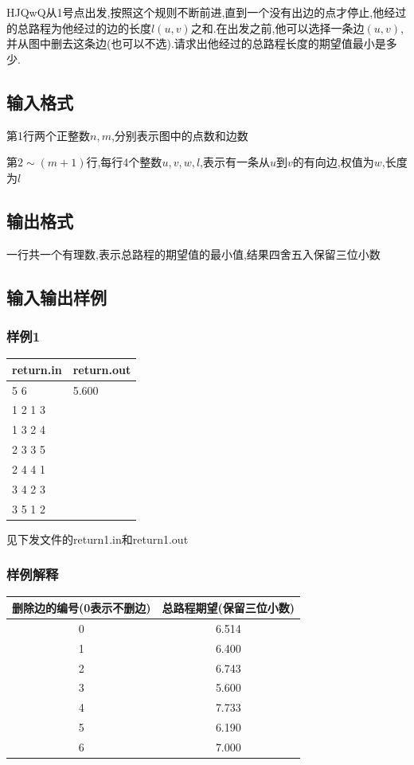 \documentclass[12pt]{ctexart}
\begin{document}
	HJQwQ从1号点出发,按照这个规则不断前进,直到一个没有出边的点才停止,他经过的总路程为他经过的边的长度$l(u,v)$之和.在出发之前,他可以选择一条边$(u,v)$,并从图中删去这条边(也可以不选).请求出他经过的总路程长度的期望值最小是多少.
	\subsection{输入格式}
	第1行两个正整数$n,m$,分别表示图中的点数和边数

	第$2\sim(m+1)$行,每行4个整数$u,v,w,l$,表示有一条从$u$到$v$的有向边,权值为$w$,长度为$l$
	\subsection{输出格式}
	一行共一个有理数,表示总路程的期望值的最小值,结果四舍五入保留三位小数
	\subsection{输入输出样例}
	\subsubsection{样例1}
	\begin{center}
		\begin{tabular}{|p{6cm}|p{6cm}|}
			\hline return.in&return.out\\
			\hline	5 6&5.600\\
					1 2 1 3&\\
					1 3 2 4&\\
					2 3 3 5&\\
					2 4 4 1&\\
					3 4 2 3&\\
					3 5 1 2&\\
			\hline
		\end{tabular}
	\end{center}
	见下发文件的return1.in和return1.out
	\subsubsection{样例解释}
	\begin{center}
		\begin{tabular}{|c|c|}
			\hline 删除边的编号(0表示不删边)&总路程期望(保留三位小数)\\
			\hline 0&6.514\\
			\hline 1&6.400\\
			\hline 2&6.743\\
			\hline 3&5.600\\
			\hline 4&7.733\\
			\hline 5&6.190\\
			\hline 6&7.000\\
			\hline
		\end{tabular}
	\end{center}
\end{document}
